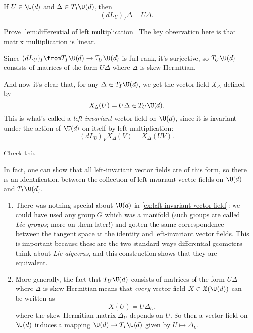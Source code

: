 \begin{example}
	\begin{lemma}\label{lem:differential of left multiplication}
		If $U \in \U(d)$ and $\Delta \in T_I \U(d)$, then
		\[
			(d L_U)_I \Delta = U \Delta.
		\]
	\end{lemma}
	
	\begin{exercise}
		Prove \cref{lem:differential of left multiplication}. The key observation here is that matrix multiplication is linear.
	\end{exercise}
	
	Since $(d L_U)_I \from T_I \U(d) \to T_U \U(d)$ is full rank, it's surjective, so $T_U \U(d)$ consists of matrices of the form $U \Delta$ where $\Delta$ is skew-Hermitian.
	
	
	And now it's clear that, for any $\Delta \in T_I \U(d)$, we get the vector field $X_\Delta$ defined by
	\[
		X_\Delta(U) = U\Delta \in T_U \U(d).
	\]
	This is what's called a \emph{left-invariant} vector field on $\U(d)$, since it is invariant under the action of $\U(d)$ on itself by left-multiplication:
	\[
		(d L_U)_V X_\Delta(V) = X_\Delta(UV).
	\]
	
	\begin{exercise}
		Check this.
	\end{exercise}
	
	In fact, one can show that all left-invariant vector fields are of this form, so there is an identification between the collection of left-invariant vector fields on $\U(d)$ and $T_I \U(d)$.
\end{example}

\begin{remark}
	\begin{enumerate}
		\item There was nothing special about $\U(d)$ in \cref{ex:left invariant vector field}: we could have used any group $G$ which was a manifold (such groups are called \emph{Lie groups}; more on them later!) and gotten the same correspondence between the tangent space at the identity and left-invariant vector fields. This is important because these are the two standard ways differential geometers think about \emph{Lie algebras}, and this construction shows that they are equivalent.
		
		\item More generally, the fact that $T_U \U(d)$ consists of matrices of the form $U \Delta$ where $\Delta$ is skew-Hermitian means that \emph{every} vector field $X \in \mathfrak{X}(\U(d))$ can be written as
		\[
			X(U) = U \Delta_U,
		\]
		where the skew-Hermitian matrix $\Delta_U$ depends on $U$. So then a vector field on $\U(d)$ induces a mapping $\U(d) \to T_I \U(d)$ given by $U \mapsto \Delta_U$.
	\end{enumerate}
\end{remark}	
	
